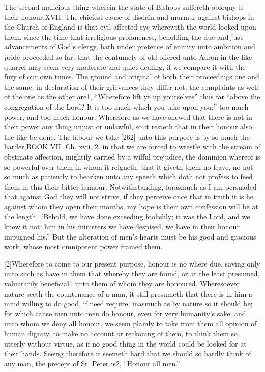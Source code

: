 The second malicious thing wherein the state of Bishops suffereth obloquy is their honour.XVII. The chiefest cause of disdain and murmur against bishops in the Church of England is that evil-affected eye wherewith the world looked upon them, since the time that irreligious profaneness, beholding the due and just advancements of God’s clergy, hath under pretence of enmity unto ambition and pride proceeded so far, that the contumely of old offered unto Aaron in the like quarrel may seem very moderate and quiet dealing, if we compare it with the fury of our own times. The ground and original of both their proceedings one and the same; in declaration of their grievances they differ not; the complaints as well of the one as the other are1, “Wherefore lift ye up yourselves” thus far “above the congregation of the Lord? It is too much which you take upon you;” too much power, and too much honour. Wherefore as we have shewed that there is not in their power any thing unjust or unlawful, so it resteth that in their honour also the like be done. The labour we take [262] unto this purpose is by so much the harder,BOOK VII. Ch. xvii. 2. in that we are forced to wrestle with the stream of obstinate affection, mightily carried by a wilful prejudice, the dominion whereof is so powerful over them in whom it reigneth, that it giveth them no leave, no not so much as patiently to hearken unto any speech which doth not profess to feed them in this their bitter humour. Notwithstanding, forasmuch as I am persuaded that against God they will not strive, if they perceive once that in truth it is he against whom they open their mouths, my hope is their own confession will be at the length, “Behold, we have done exceeding foolishly; it was the Lord, and we knew it not; him in his ministers we have despised, we have in their honour impugned his.” But the alteration of men’s hearts must be his good and gracious work, whose most omnipotent power framed them.

[2]Wherefore to come to our present purpose, honour is no where due, saving only unto such as have in them that whereby they are found, or at the least presumed, voluntarily beneficial1 unto them of whom they are honoured. Wheresoever nature seeth the countenance of a man, it still presumeth that there is in him a mind willing to do good, if need require, inasmuch as by nature so it should be; for which cause men unto men do honour, even for very humanity’s sake: and unto whom we deny all honour, we seem plainly to take from them all opinion of human dignity, to make no account or reckoning of them, to think them so utterly without virtue, as if no good thing in the world could be looked for at their hands. Seeing therefore it seemeth hard that we should so hardly think of any man, the precept of St. Peter is2, “Honour all men.”

